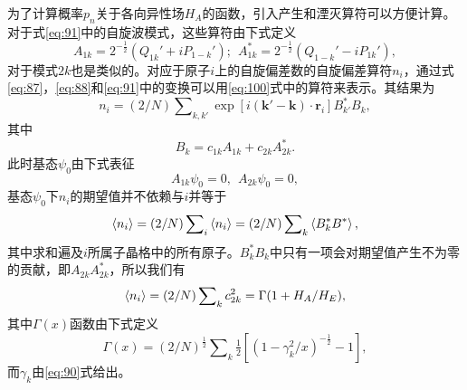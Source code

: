 \documentclass{article}
\begin{document}
为了计算概率$p_n$关于各向异性场$H_A$的函数，引入产生和湮灭算符可以方便计算。对于式\eqref{eq:91}中的自旋波模式，这些算符由下式定义
\begin{equation} \label{eq:100}
A_{1k}=2^{-\frac{1}{2}}(Q_{1k}'+iP_{1-k}');~~A_{1k}^*=2^{-\frac{1}{2}}(Q_{1-k}'-iP_{1k}'),
\end{equation}
对于模式$2k$也是类似的。对应于原子$i$上的自旋偏差数的自旋偏差算符$n_i$，通过式\eqref{eq:87}，\eqref{eq:88}和\eqref{eq:91}中的变换可以用\eqref{eq:100}式中的算符来表示。其结果为
\begin{equation} \label{eq:101}
n_i=(2/N)\sum\nolimits_{k,k'}\exp[i(\mathbf{k}'-\mathbf{k})\cdot\mathbf{r}_i]B_{k'}^*B_k,
\end{equation}
其中
\begin{equation} \label{eq:102}
B_k=c_{1k}A_{1k}+c_{2k}A_{2k}^*.
\end{equation}
此时基态$\psi_0$由下式表征
\[
A_{1k}\psi_0=0,~~A_{2k}\psi_0=0,
\]
基态$\psi_0$下$n_i$的期望值并不依赖与$i$并等于
\begin{equation} \label{eq:103}
\braket{n_i}=(2/N)\sum\nolimits_i\braket{n_i}=(2/N)\sum\nolimits_k\braket{B_k^*B^*},
\end{equation}
其中求和遍及$i$所属子晶格中的所有原子。$B_k^*B_k$中只有一项会对期望值产生不为零的贡献，即$A_{2k}A_{2k}^*$，所以我们有
\begin{equation} \label{eq:104}
\braket{n_i}=(2/N)\sum\nolimits_kc_{2k}^2=\Gamma(1+H_A/H_E),
\end{equation}
其中$\Gamma(x)$函数由下式定义
\begin{equation} \label{eq:105}
\Gamma(x)=(2/N)^\frac{1}{2}\sum\nolimits_k\tfrac{1}{2}[(1-\gamma_k^2/x)^{-\frac{1}{2}}-1],
\end{equation}
而$\gamma_k$由\eqref{eq:90}式给出。
\end{document}
